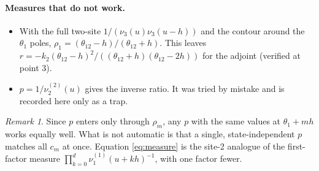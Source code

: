 \documentclass[11pt]{article}
\theoremstyle{definition}
\theoremstyle{remark}
\newtheorem*{remark}{Remark}
\begin{document}
\paragraph{Measures that do not work.}
\begin{itemize}
\item With the full two-site $1/(\nu_3(u)\nu_3(u-h))$ and the contour around the $\theta_1$ poles, $\rho_1=(\theta_{12}-h)/(\theta_{12}+h)$. This leaves $r=-k_2(\theta_{12}-h)^2/((\theta_{12}+h)(\theta_{12}-2h))$ for the adjoint (verified at point 3).
\item $p=1/\nu^{(2)}_2(u)$ gives the inverse ratio. It was tried by mistake and is recorded here only as a trap.
\end{itemize}

\begin{remark}
Since $p$ enters only through $\rho_m$, any $p$ with the same values at $\theta_1+mh$ works equally well. What is not automatic is that a single, state-independent $p$ matches all $c_m$ at once. Equation \eqref{eq:measure} is the site-2 analogue of the first-factor measure $\prod_{k=0}^{d}\nu^{(1)}_1(u+kh)^{-1}$, with one factor fewer.
\end{remark}

\end{document}
